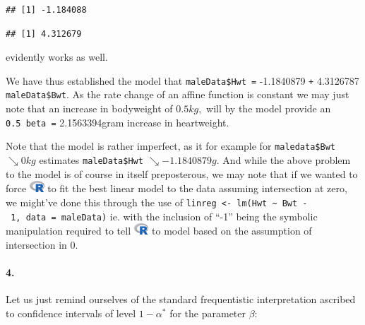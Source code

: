 \documentclass[
]{article}
\newenvironment{Shaded}{\begin{snugshade}}{\end{snugshade}}
\newcommand{\DecValTok}[1]{\textcolor[rgb]{0.00,0.00,0.81}{#1}}
\newcommand{\KeywordTok}[1]{\textcolor[rgb]{0.13,0.29,0.53}{\textbf{#1}}}
\newcommand{\NormalTok}[1]{#1}
\newcommand{\OperatorTok}[1]{\textcolor[rgb]{0.81,0.36,0.00}{\textbf{#1}}}
\begin{document}
\begin{verbatim}
## [1] -1.184088
\end{verbatim}

\begin{Shaded}
\end{Shaded}

\begin{verbatim}
## [1] 4.312679
\end{verbatim}

evidently works as well.

We have thus established the model that \texttt{maleData\$Hwt\ =}
-1.1840879 \texttt{+} 4.3126787 \texttt{maleData\$Bwt}. As the rate
change of an affine function is constant we may just note that an
increase in bodyweight of \(0.5kg,\) will by the model provide an
\texttt{0.5\ beta\ =} 2.1563394gram increase in heartweight.

Note that the model is rather imperfect, as it for example for
\texttt{maledata\$Bwt} \(\searrow 0 kg\) estimates
\texttt{maleData\$Hwt} \(\searrow -1.1840879 g\). And while the above
problem to the model is of course in itself preposterous, we may note
that if we wanted to force
\includegraphics[width=\textwidth,height=0.16667in]{R_logo.png} to fit
the best linear model to the data assuming intersection at zero, we
might've done this through the use of
\texttt{linreg\ \textless{}-\ lm(Hwt\ \textasciitilde{}\ Bwt\ -\ 1,\ data\ =\ maleData)}
ie. with the inclusion of ``-1'' being the symbolic manipulation
required to tell
\includegraphics[width=\textwidth,height=0.16667in]{R_logo.png} to model
based on the assumption of intersection in \(0.\)

\hypertarget{section-6}{%
\paragraph{\texorpdfstring{\textbf{4.}}{4.}}\label{section-6}}

Let us just remind ourselves of the standard frequentistic
interpretation ascribed to confidence intervals of level \(1-\alpha^*\)
for the parameter \(\beta\):
\end{document}
